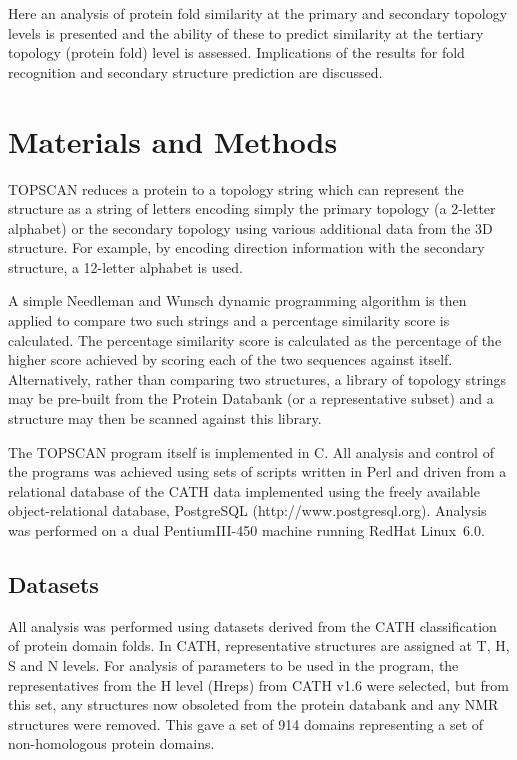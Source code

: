 \documentclass{article}
\begin{document}
Here an analysis of protein fold similarity at the primary and
secondary topology levels is presented and the ability of these to
predict similarity at the tertiary topology (protein fold) level is
assessed.  Implications of the results for fold recognition and
secondary structure prediction are discussed.


\section{Materials and Methods}
TOPSCAN reduces a protein to a topology string which can represent the
structure as a string of letters encoding simply the primary topology
(a 2-letter alphabet) or the secondary topology using various
additional data from the 3D structure. For example, by encoding
direction information with the secondary structure, a 12-letter
alphabet is used.

A simple Needleman and Wunsch dynamic programming
algorithm\cite{needleman:wunsch} is then applied to compare two such
strings and a percentage similarity score is calculated.  The
percentage similarity score is calculated as the percentage of the
higher score achieved by scoring each of the two sequences against
itself.  Alternatively, rather than comparing two structures, a
library of topology strings may be pre-built from the Protein Databank
(or a representative subset) and a structure may then be scanned
against this library.

The TOPSCAN program itself is implemented in C. All analysis and
control of the programs was achieved using sets of scripts written in
Perl and driven from a relational database of the CATH data
implemented using the freely available object-relational database,
PostgreSQL (http://www.postgresql.org). Analysis was performed on a
dual PentiumIII-450 machine running RedHat Linux~6.0.

\subsection{Datasets}
All analysis was performed using datasets derived from the CATH
classification of protein domain folds\cite{orengo:cath}. In CATH,
representative structures are assigned at T, H, S and N levels.  For
analysis of parameters to be used in the program, the representatives
from the H level (Hreps) from CATH v1.6 were selected, but from this
set, any structures now obsoleted from the protein
databank\cite{berman:pdb} and any NMR structures were removed. This
gave a set of 914 domains representing a set of non-homologous protein
domains.
\end{document}

